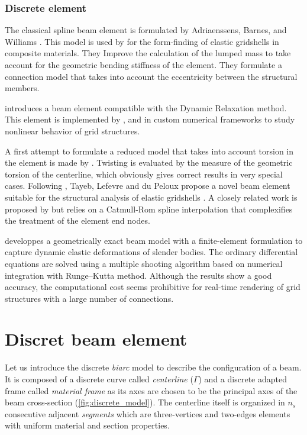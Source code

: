\subsubsection{Discrete element}

The classical  spline beam element is formulated by Adriaenssens, Barnes, and Williams \cite{Barnes1999,Adriaenssens1999,Adriaenssens2001}. This model is used by \cite{Douthe2006} for the form-finding of elastic gridshells in composite materials. They Improve the calculation of the lumped mass to take account for the geometric bending stiffness of the element. They formulate a connection model that takes into account the eccentricity between the structural members.

 introduces a  beam element compatible with the Dynamic Relaxation method. This element is implemented by ,  and \cite{DAmico2014} in custom numerical frameworks to study nonlinear behavior of grid structures.

A first attempt to formulate a reduced model that takes into account torsion in the element is made by . Twisting is evaluated by the measure of the geometric torsion of the centerline, which obviously gives correct results in very special cases. Following , Tayeb, Lefevre and du Peloux propose a novel  beam element suitable for the structural analysis of elastic gridshells \cite{DuPeloux2015,Lefevre2017}. A closely related work is proposed by  but relies on a Catmull-Rom spline interpolation that complexifies the treatment of the element end nodes.

 developpes a geometrically exact beam model with a finite-element formulation to capture dynamic elastic deformations of slender bodies. The ordinary differential equations are solved using a multiple shooting algorithm based on numerical integration with Runge–Kutta method. Although the results show a good accuracy, the computational cost seems prohibitive for real-time rendering of grid structures with a large number of connections.






\section{Discret beam element}\label{sec:dmodel}
Let us introduce the discrete \emph{biarc} model to describe the configuration of a beam. It is composed of a discrete curve called \emph{centerline} ($\Gamma$) and a discrete adapted frame called \emph{material frame} as its axes are chosen to be the principal axes of the beam cross-section (\cref{fig:discrete_model}). The centerline itself is organized in $n_s$ consecutive adjacent \emph{segments} which are three-vertices and two-edges elements with uniform material and section properties.

